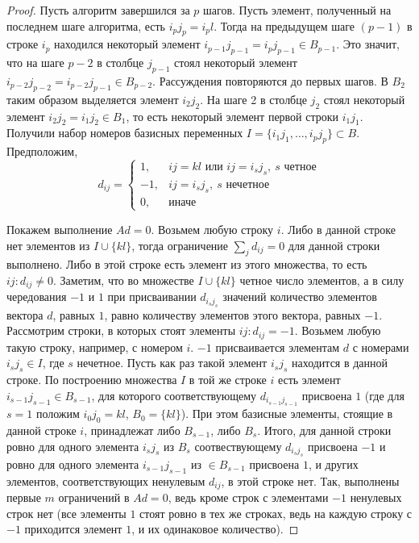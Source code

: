 \documentclass[12pt]{article}
\theoremstyle{definition}
\theoremstyle{plain}
\theoremstyle{definition}
\begin{document}
\begin{proof}
Пусть алгоритм завершился за $p$ шагов. Пусть элемент,
полученный на последнем шаге алгоритма, есть $i_pj_p = i_pl$.
Тогда на предыдущем шаге $(p-1)$ в строке $i_p$ находился некоторый элемент
$i_{p-1}j_{p-1} = i_pj_{p-1} \in B_{p-1}$. Это значит, что на шаге $p-2$ в столбце
$j_{p-1}$ стоял некоторый элемент $i_{p-2}j_{p-2} = i_{p-2}j_{p-1} \in B_{p-2}$.
Рассуждения повторяются до первых шагов. В $B_2$ таким образом выделяется
элемент $i_2j_2$. На шаге 2 в столбце
$j_2$ стоял некоторый элемент $i_{2}j_{2} = i_{1}j_{2} \in B_{1}$, то есть
некоторый элемент первой строки $i_1j_1$. Получили набор номеров
базисных переменных $I = \{i_1j_1,\dots,i_pj_p\} \subset B$. Предположим,
\[
d_{ij} =
\begin{cases}
1, & ij=kl \text{ или } ij = i_sj_s, \: s \text{ четное}\\
-1, & ij = i_sj_s, \: s \text{ нечетное}\\
0, & \text{иначе}
\end{cases}
\]

Покажем выполнение $Ad = 0$. Возьмем любую строку $i$. Либо в данной строке нет
элементов из $I \cup \{kl\}$,
тогда ограничение $\sum_{j} d_{ij} = 0$ для данной строки выполнено. Либо в этой
строке есть элемент из этого множества, то есть $ij: d_{ij} \neq 0$. 
Заметим, что во множестве $I \cup \{kl\}$ четное число элементов, а в силу
чередования $-1$ и $1$ при присваивании $d_{i_sj_s}$ значений
количество элементов вектора $d$, равных $1$, равно количеству элементов этого
вектора, равных $-1$.
Рассмотрим строки, в которых стоят элементы $ij: d_{ij} = -1$. Возьмем
любую такую строку, например, с номером $i$. $-1$ присваивается элементам $d$
с номерами $i_sj_s \in I$, где $s$ нечетное. Пусть как раз такой элемент
$i_sj_s$ находится в данной строке. По построению множества $I$
в той же строке $i$ есть элемент $i_{s-1}j_{s-1} \in B_{s-1}$, для которого
соответствующему $d_{i_{s-1}j_{s-1}}$ присвоена $1$ (где для $s=1$ положим
$i_0j_0 = kl$, $B_0 = \{kl\}$). При этом базисные элементы,
стоящие в данной строке $i$, принадлежат либо $B_{s-1}$, либо $B_s$. Итого, для
данной строки ровно для одного элемента $i_sj_s$ из $B_s$ соотвествующему
$d_{i_sj_s}$ присвоена $-1$ и ровно для одного элемента $i_{s-1}j_{s-1}$
из $\in B_{s-1}$ присвоена $1$, и других элементов, соответствующих ненулевым
$d_{ij}$, в этой строке нет. Так, выполнены первые $m$ ограничений в $Ad=0$,
ведь кроме строк с элементами $-1$ ненулевых строк нет (все элементы $1$
стоят ровно в тех же строках, ведь на каждую строку с $-1$ приходится 
элемент $1$, и их одинаковое количество).


\end{proof}
\end{document}
